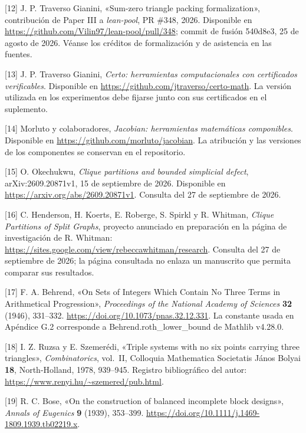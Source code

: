 \documentclass[spanish,11pt,a4paper]{article}
\begin{document}
{[}12{]} J. P. Traverso Gianini, «Sum-zero triangle packing formalization», contribución de Paper III a \emph{lean-pool}, PR \#348, 2026. Disponible en \url{https://github.com/Vilin97/lean-pool/pull/348}; commit de fusión {\ttfamily\small 540d8e3}, 25 de agosto de 2026. Véanse los créditos de formalización y de asistencia en las fuentes.

{[}13{]} J. P. Traverso Gianini, \emph{Certo: herramientas computacionales con certificados verificables}. Disponible en \url{https://github.com/jtraverso/certo-math}. La versión utilizada en los experimentos debe fijarse junto con sus certificados en el suplemento.

{[}14{]} Morluto y colaboradores, \emph{Jacobian: herramientas matemáticas componibles}. Disponible en \url{https://github.com/morluto/jacobian}. La atribución y las versiones de los componentes se conservan en el repositorio.

{[}15{]} O. Okechukwu, \emph{Clique partitions and bounded simplicial defect}, arXiv:2609.20871v1, 15 de septiembre de 2026. Disponible en \url{https://arxiv.org/abs/2609.20871v1}. Consulta del 27 de septiembre de 2026.

{[}16{]} C. Henderson, H. Koerts, E. Roberge, S. Spirkl y R. Whitman, \emph{Clique Partitions of Split Graphs}, proyecto anunciado en preparación en la página de investigación de R. Whitman: \url{https://sites.google.com/view/rebeccawhitman/research}. Consulta del 27 de septiembre de 2026; la página consultada no enlaza un manuscrito que permita comparar sus resultados.

{[}17{]} F. A. Behrend, «On Sets of Integers Which Contain No Three Terms in Arithmetical Progression», \emph{Proceedings of the National Academy of Sciences} \textbf{32} (1946), 331--332. \url{https://doi.org/10.1073/pnas.32.12.331}. La constante usada en Apéndice G.2 corresponde a {\ttfamily\small Behrend.\discretionary{\hbox{\ensuremath{\hookrightarrow}}}{}{}roth\_\discretionary{\hbox{\ensuremath{\hookrightarrow}}}{}{}lower\_\discretionary{\hbox{\ensuremath{\hookrightarrow}}}{}{}bound} de Mathlib v4.28.0.

{[}18{]} I. Z. Ruzsa y E. Szemerédi, «Triple systems with no six points carrying three triangles», \emph{Combinatorics}, vol.~II, Colloquia Mathematica Societatis János Bolyai \textbf{18}, North-Holland, 1978, 939--945. Registro bibliográfico del autor: \url{https://www.renyi.hu/~szemered/pub.html}.

{[}19{]} R. C. Bose, «On the construction of balanced incomplete block designs», \emph{Annals of Eugenics} \textbf{9} (1939), 353--399. \url{https://doi.org/10.1111/j.1469-1809.1939.tb02219.x}.
\end{document}
